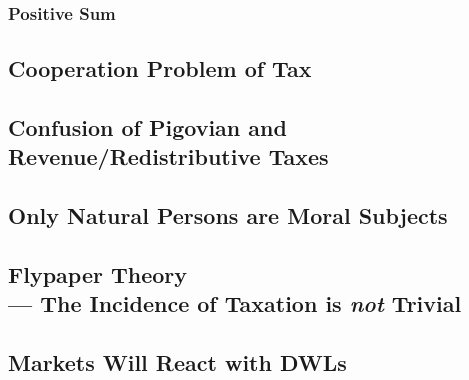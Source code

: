 
\subsubsection{Positive Sum}

\subsection{Cooperation Problem of Tax}

\subsection{Confusion of Pigovian and Revenue/Redistributive Taxes}

\subsection{Only Natural Persons are Moral Subjects}

\subsection[Flypaper Theory]{Flypaper Theory \\--- The Incidence of Taxation is \emph{not} Trivial}

\subsection{Markets Will React with DWLs}


